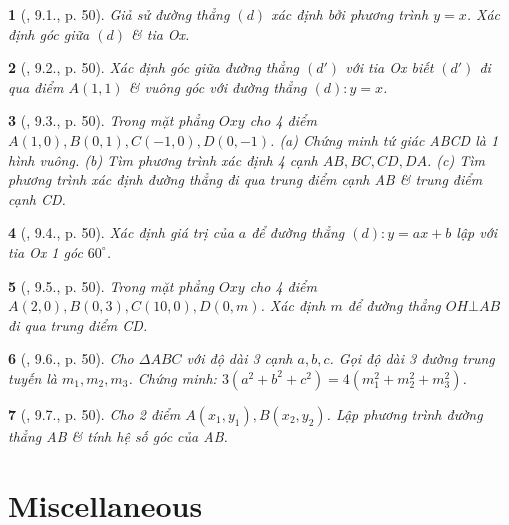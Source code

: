 \documentclass{article}
\newtheorem{baitoan}{}
\begin{document}
\begin{baitoan}[\cite{TLCT_THCS_Toan_9_dai_so}, 9.1., p. 50]
	Giả sử đường thẳng $(d)$ xác định bởi phương trình $y = x$. Xác định góc giữa $(d)$ \& tia Ox.
\end{baitoan}

\begin{baitoan}[\cite{TLCT_THCS_Toan_9_dai_so}, 9.2., p. 50]
	Xác định góc giữa đường thẳng $(d')$ với tia Ox biết $(d')$ đi qua điểm $A(1,1)$ \& vuông góc với đường thẳng $(d):y = x$.
\end{baitoan}

\begin{baitoan}[\cite{TLCT_THCS_Toan_9_dai_so}, 9.3., p. 50]
	Trong mặt phẳng $Oxy$ cho 4 điểm $A(1,0),B(0,1),C(-1,0),D(0,-1)$. (a) Chứng minh tứ giác ABCD là 1 hình vuông. (b) Tìm phương trình xác định 4 cạnh $AB,BC,CD,DA$. (c) Tìm phương trình xác định đường thẳng đi qua trung điểm cạnh AB \& trung điểm cạnh CD.
\end{baitoan}

\begin{baitoan}[\cite{TLCT_THCS_Toan_9_dai_so}, 9.4., p. 50]
	Xác định giá trị của $a$ để đường thẳng $(d):y = ax + b$ lập với tia Ox 1 góc $60^\circ$.
\end{baitoan}

\begin{baitoan}[\cite{TLCT_THCS_Toan_9_dai_so}, 9.5., p. 50]
	Trong mặt phẳng $Oxy$ cho 4 điểm $A(2,0),B(0,3),C(10,0),D(0,m)$. Xác định $m$ để đường thẳng $OH\bot AB$ đi qua trung điểm CD.
\end{baitoan}

\begin{baitoan}[\cite{TLCT_THCS_Toan_9_dai_so}, 9.6., p. 50]
	Cho $\Delta ABC$ với độ dài 3 cạnh $a,b,c$. Gọi độ dài 3 đường trung tuyến là $m_1,m_2,m_3$. Chứng minh: $3(a^2 + b^2 + c^2) = 4(m_1^2 + m_2^2 + m_3^2)$.
\end{baitoan}

\begin{baitoan}[\cite{TLCT_THCS_Toan_9_dai_so}, 9.7., p. 50]
	Cho 2 điểm $A(x_1,y_1),B(x_2,y_2)$. Lập phương trình đường thẳng AB \& tính hệ số góc của AB.
\end{baitoan}


\section{Miscellaneous}
\end{document}
